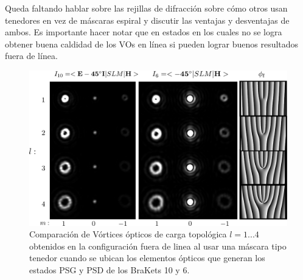 Queda faltando hablar sobre las rejillas de difracción sobre cómo
otros usan tenedores en vez de máscaras espiral y discutir las
ventajas y desventajas de ambos. 
Es importante hacer notar que en estados en los cuales no se logra
obtener buena caldidad de los VOs en línea si pueden lograr buenos
resultados fuera de línea. 
\newpage
\pagebreak
\begin{figure}[h!]
\centering
\includegraphics[scale=0.3]{diffracted_OV_I6_and_I10.pdf}
\caption[Vórtices ópticos difractados por una rejilla tipo
blazed.]{Comparación de Vórtices ópticos de carga topológica $l=1...4$ obtenidos en
  la configuración fuera de linea al usar una máscara tipo tenedor
  cuando se ubican los elementos ópticos que generan los estados PSG y PSD de los
  BraKets 10 y 6.} 
\label{fig:diffracted_OV_I6_and_I10}
\end{figure}
\newpage
\pagebreak[4]
